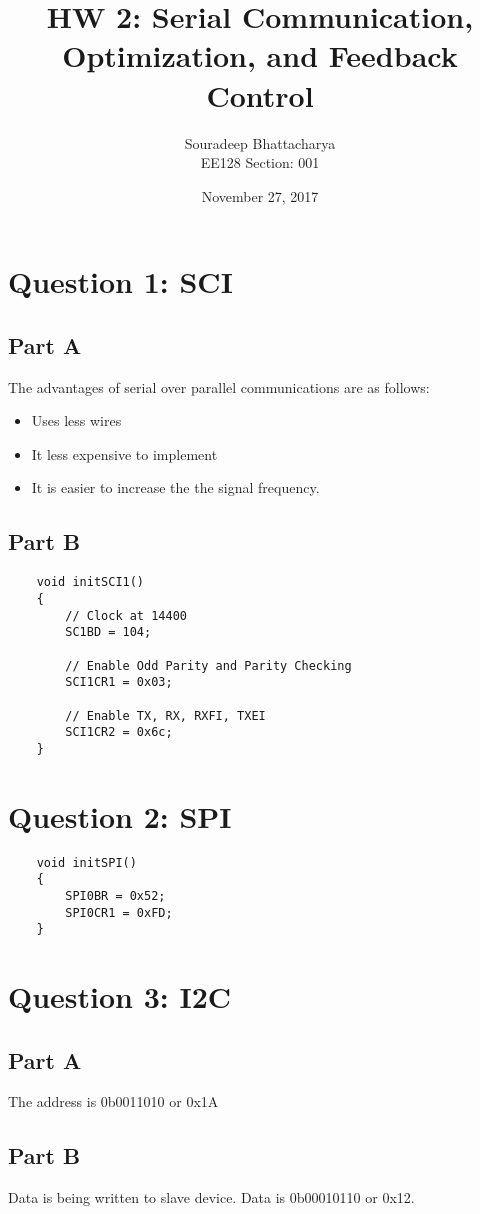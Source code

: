 \documentclass{article}
\title{HW 2: Serial Communication, Optimization, and Feedback Control}
\date{November 27, 2017}
\author{Souradeep Bhattacharya \\ EE128 Section: 001}
\begin{document}
	\maketitle
	\section*{Question 1: SCI}
	\subsection*{Part A}
	The advantages of serial over parallel communications are as follows:
	\begin{itemize}
		\item Uses less wires
		\item It less expensive to implement
		\item It is easier to increase the the signal frequency.
	\end{itemize}
	\subsection*{Part B}
	\begin{lstlisting}
	void initSCI1()
	{
		// Clock at 14400
		SC1BD = 104;
		
		// Enable Odd Parity and Parity Checking
		SCI1CR1 = 0x03;
		
		// Enable TX, RX, RXFI, TXEI
		SCI1CR2 = 0x6c;
	}
	\end{lstlisting}
	\section*{Question 2: SPI}
	\begin{lstlisting}
	void initSPI()
	{
		SPI0BR = 0x52;
		SPI0CR1 = 0xFD;
	}
	\end{lstlisting}
	\section*{Question 3: I2C}
	\subsection*{Part A}
	The address is 0b0011010 or 0x1A
	\subsection*{Part B}
	Data is being written to slave device. Data is 0b00010110 or 0x12.
\end{document}
